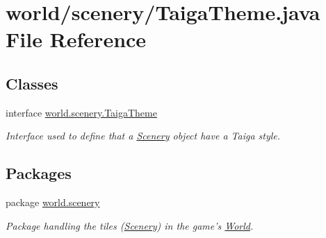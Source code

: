 \hypertarget{a00074}{\section{world/scenery/\-Taiga\-Theme.java File Reference}
\label{a00074}
}
\subsection*{Classes}
\begin{DoxyCompactItemize}
\item 
interface \hyperlink{a00028}{world.\-scenery.\-Taiga\-Theme}
\begin{DoxyCompactList}\small\item\em Interface used to define that a \hyperlink{a00024}{Scenery} object have a Taiga style. \end{DoxyCompactList}\end{DoxyCompactItemize}
\subsection*{Packages}
\begin{DoxyCompactItemize}
\item 
package \hyperlink{a00091}{world.\-scenery}
\begin{DoxyCompactList}\small\item\em Package handling the tiles (\hyperlink{a00024}{Scenery}) in the game's \hyperlink{a00039}{World}. \end{DoxyCompactList}\end{DoxyCompactItemize}
